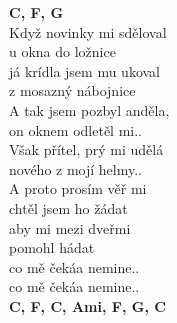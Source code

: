 \begin{multicols}{2}
\textbf{C, F, G}\\

\sloka
Když novinky mi sděloval\\
u okna do ložnice\\
já krídla jsem mu ukoval\\
z mosazný nábojnice\\

A tak jsem pozbyl anděla,\\
on oknem odletěl mi..\\
Však přítel, prý mi udělá\\
nového z mojí helmy..\\

{}A proto prosím věř mi\\
chtěl jsem ho žádat\\
aby mi mezi dveřmi\\
pomohl hádat\\
co mě čekáa nemine..\\
co mě čekáa nemine..\\

\textbf{C, F, C, Ami, F, G, C}\\

\end{multicols}